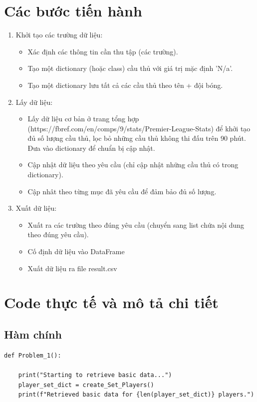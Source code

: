 \documentclass[12pt]{report}
\begin{document}
{\section{Các bước tiến hành}
	\begin{enumerate}
		\item Khởi tạo các trường dữ liệu:
		\begin{itemize}
			\item Xác định các thông tin cần thu tập (các trường).
			\item Tạo một dictionary (hoặc class) cầu thủ với giá trị mặc định 'N/a'.
			\item Tạo một dictionary lưu tất cả các cầu thủ theo tên + đội bóng.
		\end{itemize}
		\item Lấy dữ liệu:
		\begin{itemize}
			\item Lấy dữ liệu cơ bản ở trang tổng hợp (https://fbref.com/en/comps/9/stats/Premier-League-Stats) để khởi tạo đủ số lượng cầu thủ, lọc bỏ những cầu thủ không thi đấu trên 90 phút. Đưa vào dictionary để chuẩn bị cập nhật.
			\item Cập nhật dữ liệu theo yêu cầu (chỉ cập nhật những cầu thủ có trong dictionary).
			\item Cập nhât theo từng mục đã yêu cầu để đảm bảo đủ số lượng.
		\end{itemize}
		\item Xuất dữ liệu:
		\begin{itemize}
			\item Xuất ra các trường theo đúng yêu cầu (chuyển sang list chứa nội dung theo đúng yêu cầu).
			\item Cố định dữ liệu vào DataFrame
			\item Xuất dữ liệu ra file result.csv
		\end{itemize}
	\end{enumerate}
	
\section{Code thực tế và mô tả chi tiết}
\subsection{Hàm chính}
\begin{lstlisting}
def Problem_1():

	print("Starting to retrieve basic data...")
	player_set_dict = create_Set_Players()
	print(f"Retrieved basic data for {len(player_set_dict)} players.")


\end{lstlisting}}
\end{document}
